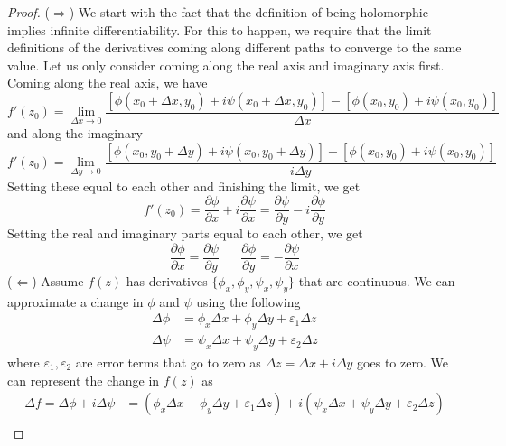 \documentclass{report}
\theoremstyle{definition}
\theoremstyle{remark}
\newcommand{\twen}{\hspace{20pt}}
\newcommand{\pd}[2]{\frac{\partial #1}{\partial#2}}
\begin{document}
\begin{proof}
    ($\Rightarrow$) We start with the fact that the definition of being holomorphic implies infinite differentiability. For this to happen, we require that the limit definitions of the derivatives coming along different paths to converge to the same value. Let us only consider coming along the real axis and imaginary axis first. Coming along the real axis, we have 
    \begin{equation*}
        f'(z_0) = \lim_{\Delta x\rightarrow 0} \frac{[\phi(x_0+\Delta x,y_0)+i\psi(x_0+\Delta x, y_0)]-[\phi(x_0,y_0)+i\psi(x_0,y_0)]}{\Delta x}
    \end{equation*}
    and along the imaginary
    \begin{equation*}
        f'(z_0) = \lim_{\Delta y\rightarrow 0} \frac{[\phi(x_0 ,y_0+\Delta y)+i\psi(x_0, y_0+\Delta y)]-[\phi(x_0,y_0)+i\psi(x_0,y_0)]}{i\Delta y}
    \end{equation*}
    Setting these equal to each other and finishing the limit, we get 
    \begin{equation*}
        f'(z_0) =\pd{\phi}{x}+i\pd{\psi}{x} = \pd{\psi}{y} -i\pd{\phi}{y}
    \end{equation*}
    Setting the real and imaginary parts equal to each other, we get 
    \begin{equation*}
        \pd{\phi}{x} = \pd{\psi}{y} \twen \pd{\phi}{y} = -\pd{\psi}{x}
    \end{equation*}
    ($\Leftarrow$) Assume $f(z)$ has derivatives $\{\phi_x, \phi_y,\psi_x,\psi_y\}$ that are continuous. We can approximate a change in $\phi$ and $\psi$ using the following 
    \begin{equation*}
        \begin{split}
            \Delta \phi &= \phi_x\Delta x+ \phi_y\Delta y +\varepsilon_1\Delta z \\
            \Delta \psi&=\psi_x\Delta x+\psi_y \Delta y+\varepsilon_2\Delta z
        \end{split}
    \end{equation*}
    where $\varepsilon_1, \varepsilon_2$ are error terms that go to zero as $\Delta z=\Delta x+i\Delta y$ goes to zero. We can represent the change in $f(z)$ as 
    \begin{equation*}
        \begin{split}
            \Delta f=\Delta \phi + i\Delta \psi &= (\phi_x\Delta x+ \phi_y\Delta y +\varepsilon_1\Delta z) + i(\psi_x\Delta x+\psi_y \Delta y+\varepsilon_2\Delta z)\\

\end{split}
\end{equation*}
\end{proof}
\end{document}
